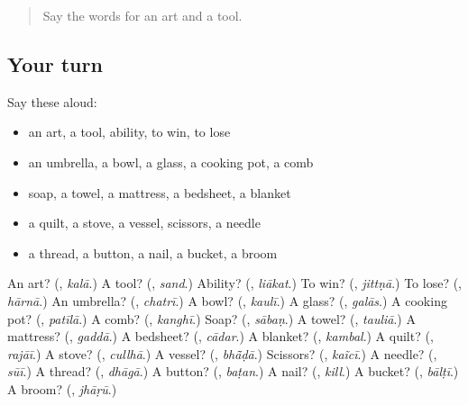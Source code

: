 \label{lesson:PA-R116-second-pass-things-in-the-house}



\begin{quote}
Say the words for an art and a tool.
\end{quote}

\subsection*{Your turn}
Say these aloud:

\begin{itemize}
\raggedright
  \item an art, a tool, ability, to win, to lose
  \item an umbrella, a bowl, a glass, a cooking pot, a comb
  \item soap, a towel, a mattress, a bedsheet, a blanket
  \item a quilt, a stove, a vessel, scissors, a needle
  \item a thread, a button, a nail, a bucket, a broom
\end{itemize}

\begin{tcolorbox}[breakable,colback=teal!4,colframe=teal!35!black,title={Before you move on}]
An art? (\textbf{}, \emph{kalā}.) A tool? (\textbf{}, \emph{sand}.) Ability? (\textbf{}, \emph{liākat}.) To win? (\textbf{}, \emph{jittṇā}.) To lose? (\textbf{}, \emph{hārnā}.) An umbrella? (\textbf{}, \emph{chatrī}.) A bowl? (\textbf{}, \emph{kaulī}.) A glass? (\textbf{}, \emph{galās}.) A cooking pot? (\textbf{}, \emph{patīlā}.) A comb? (\textbf{}, \emph{kanghī}.) Soap? (\textbf{}, \emph{sābaṇ}.) A towel? (\textbf{}, \emph{tauliā}.) A mattress? (\textbf{}, \emph{gaddā}.) A bedsheet? (\textbf{}, \emph{cādar}.) A blanket? (\textbf{}, \emph{kambal}.) A quilt? (\textbf{}, \emph{rajāī}.) A stove? (\textbf{}, \emph{cullhā}.) A vessel? (\textbf{}, \emph{bhā̃ḍā}.) Scissors? (\textbf{}, \emph{kaĩcī}.) A needle? (\textbf{}, \emph{sūī}.) A thread? (\textbf{}, \emph{dhāgā}.) A button? (\textbf{}, \emph{baṭan}.) A nail? (\textbf{}, \emph{kill}.) A bucket? (\textbf{}, \emph{bālṭī}.) A broom? (\textbf{}, \emph{jhāṛū}.)
\end{tcolorbox}
